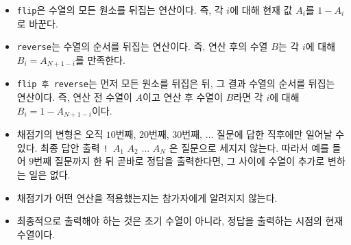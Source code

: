 \begin{itemize}
    \item \texttt{flip}은 수열의 모든 원소를 뒤집는 연산이다. 즉, 각 $i$에 대해 현재 값 $A_i$를 $1-A_i$로 바꾼다.
    \item \texttt{reverse}는 수열의 순서를 뒤집는 연산이다. 즉, 연산 후의 수열 $B$는 각 $i$에 대해 $B_i = A_{N+1-i}$를 만족한다.
    \item \texttt{flip 후 reverse}는 먼저 모든 원소를 뒤집은 뒤, 그 결과 수열의 순서를 뒤집는 연산이다. 즉, 연산 전 수열이 $A$이고 연산 후 수열이 $B$라면 각 $i$에 대해 $B_i = 1 - A_{N+1-i}$이다.
    \item 채점기의 변형은 오직 $10$번째, $20$번째, $30$번째, $\dots$ 질문에 답한 직후에만 일어날 수 있다. 최종 답안 출력 \texttt{! }$A_1$ $A_2$ $\dots$ $A_N$ 은 질문으로 세지지 않는다. 따라서 예를 들어 $9$번째 질문까지 한 뒤 곧바로 정답을 출력한다면, 그 사이에 수열이 추가로 변하는 일은 없다.
    \item 채점기가 어떤 연산을 적용했는지는 참가자에게 알려지지 않는다.
    \item 최종적으로 출력해야 하는 것은 초기 수열이 아니라, 정답을 출력하는 시점의 현재 수열이다.
\end{itemize}